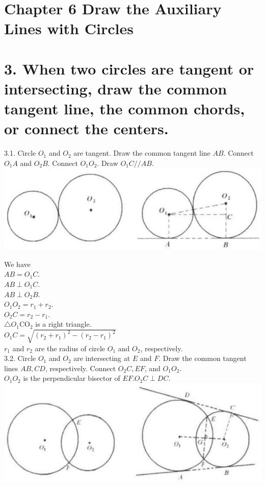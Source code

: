 \documentclass[10pt]{article}
\begin{document}
\section*{Chapter 6 Draw the Auxiliary Lines with Circles}
\section*{3. When two circles are tangent or intersecting, draw the common tangent line, the common chords, or connect the centers.}
3.1. Circle \(O_{1}\) and \(O_{2}\) are tangent. Draw the common tangent line \(A B\). Connect \(O_{1} A\) and \(O_{2} B\). Connect \(O_{1} O_{2}\). Draw \(O_{1} C / / A B\).\\
\includegraphics[max width=\textwidth, center]{2025_04_17_97bc1f7e44d93c271a88g-175(1)}

We have\\
\(A B=O_{1} C\).\\
\(A B \perp O_{1} C\).\\
\(A B \perp O_{2} B\).\\
\(O_{1} O_{2}=r_{1}+r_{2}\).\\
\(O_{2} C=r_{2}-r_{1}\).\\
\(\triangle O_{1} \mathrm{CO}_{2}\) is a right triangle.\\
\(O_{1} C=\sqrt{\left(r_{2}+r_{1}\right)^{2}-\left(r_{2}-r_{1}\right)^{2}}\)\\
\(r_{1}\) and \(r_{2}\) are the radius of circle \(O_{1}\) and \(O_{2}\), respectively.\\
3.2. Circle \(O_{1}\) and \(O_{2}\) are intersecting at \(E\) and \(F\). Draw the common tangent lines \(A B, C D\), respectively. Connect \(O_{2} C, E F\), and \(O_{1} O_{2}\).\\
\(O_{1} O_{2}\) is the perpendicular bisector of \(E F . O_{2} C \perp D C\).\\
\includegraphics[max width=\textwidth, center]{2025_04_17_97bc1f7e44d93c271a88g-175}
\end{document}
